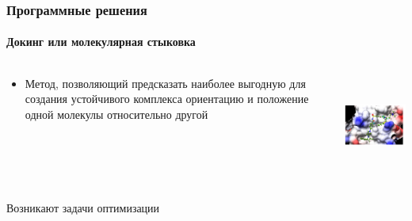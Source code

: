 \begin{frame}
  \frametitle{Программные решения}
  \framesubtitle{Докинг или молекулярная стыковка}
  \begin{columns}
    \begin{column}{0.5\textwidth}
      \begin{itemize}
        \item Метод, позволяющий предсказать наиболее выгодную для создания устойчивого комплекса ориентацию и положение
          одной молекулы относительно другой
      \end{itemize}
    \end{column}
    \begin{column}{0.5\textwidth}
  \includegraphics[height=1.3in]{images/docking.png}
\end{column}
\end{columns}
   \begin{center} Возникают задачи оптимизации \end{center}
\end{frame}

